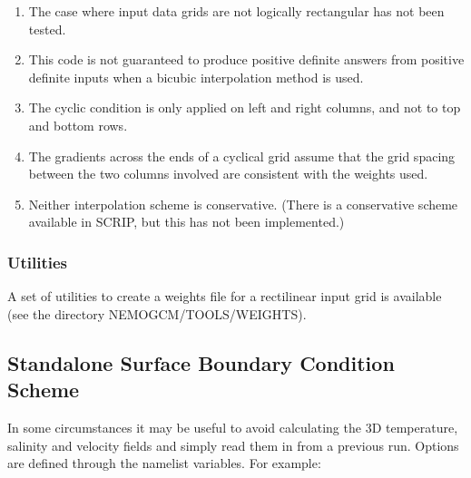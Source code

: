 \begin{enumerate}  
\item  The case where input data grids are not logically rectangular has not been tested.
\item  This code is not guaranteed to produce positive definite answers from positive definite inputs
          when a bicubic interpolation method is used.
\item  The cyclic condition is only applied on left and right columns, and not to top and bottom rows.
\item  The gradients across the ends of a cyclical grid assume that the grid spacing between 
          the two columns involved are consistent with the weights used.
\item  Neither interpolation scheme is conservative. (There is a conservative scheme available 
          in SCRIP, but this has not been implemented.)
\end{enumerate}

\subsubsection{Utilities}
\label{SBC_iof_util}

A set of utilities to create a weights file for a rectilinear input grid is available 
(see the directory NEMOGCM/TOOLS/WEIGHTS).

\subsection [Standalone Surface Boundary Condition Scheme] {Standalone Surface Boundary Condition Scheme}
\label{SAS_iof}


In some circumstances it may be useful to avoid calculating the 3D temperature, salinity and velocity fields and simply read them in from  a previous run.  
Options are defined through the   namelist variables.
For example:

